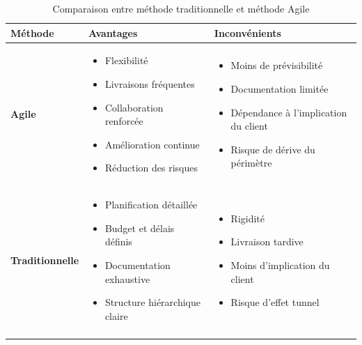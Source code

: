 \setlength{\arrayrulewidth}{1pt}
\begin{longtable}{|>{\raggedright\arraybackslash}p{3cm}|>{\raggedright\arraybackslash}p{5.5cm}|>{\raggedright\arraybackslash}p{6.5cm}|}
\hline
\rowcolor{headerbg}
\textbf{Méthode} & \textbf{Avantages} & \textbf{Inconvénients} \\
\hline
\endfirsthead
\endfoot

\textbf{Agile}
&
\begin{itemize}[left=0pt, topsep=0pt, itemsep=0pt, parsep=0pt, partopsep=0pt]
    \item[$\bullet$] Flexibilité
    \item[$\bullet$] Livraisons fréquentes
    \item[$\bullet$] Collaboration renforcée
    \item[$\bullet$] Amélioration continue
    \item[$\bullet$] Réduction des risques
\end{itemize}
&
\begin{itemize}[left=0pt, topsep=0pt, itemsep=0pt, parsep=0pt, partopsep=0pt]
    \item[$\bullet$] Moins de prévisibilité
    \item[$\bullet$] Documentation limitée
    \item[$\bullet$] Dépendance à l'implication du client
    \item[$\bullet$] Risque de dérive du périmètre
\end{itemize}
\\
\hline

\textbf{Traditionnelle}
&
\begin{itemize}[left=0pt, topsep=0pt, itemsep=0pt, parsep=0pt, partopsep=0pt]
    \item[$\bullet$] Planification détaillée
    \item[$\bullet$] Budget et délais définis
    \item[$\bullet$] Documentation exhaustive
    \item[$\bullet$] Structure hiérarchique claire
\end{itemize}
&
\begin{itemize}[left=0pt, topsep=0pt, itemsep=0pt, parsep=0pt, partopsep=0pt]
    \item[$\bullet$] Rigidité
    \item[$\bullet$] Livraison tardive
    \item[$\bullet$] Moins d'implication du client
    \item[$\bullet$] Risque d'effet tunnel
\end{itemize}
\\
\hline

\caption{Comparaison entre méthode traditionnelle et méthode Agile}
\end{longtable}
\setlength{\arrayrulewidth}{0.4pt}

